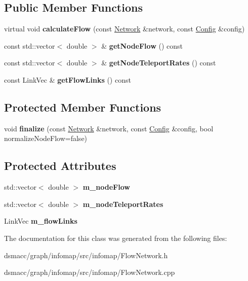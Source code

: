\subsection*{Public Member Functions}
\begin{DoxyCompactItemize}
\item 
\mbox{\label{classFlowNetwork_a7fe9ac86ec22ae9fb5a5212d30e3c014}} 
virtual void {\bfseries calculate\+Flow} (const \mbox{\hyperlink{classNetwork}{Network}} \&network, const \mbox{\hyperlink{structConfig}{Config}} \&config)
\item 
\mbox{\label{classFlowNetwork_ac7f6025ddeb7110f317882691a2cf35d}} 
const std\+::vector$<$ double $>$ \& {\bfseries get\+Node\+Flow} () const
\item 
\mbox{\label{classFlowNetwork_a1999937192326cad0d4f7d4f5aaab509}} 
const std\+::vector$<$ double $>$ \& {\bfseries get\+Node\+Teleport\+Rates} () const
\item 
\mbox{\label{classFlowNetwork_a974c66cb336b7df454c95b0335afa04d}} 
const Link\+Vec \& {\bfseries get\+Flow\+Links} () const
\end{DoxyCompactItemize}
\subsection*{Protected Member Functions}
\begin{DoxyCompactItemize}
\item 
\mbox{\label{classFlowNetwork_a451f5b6539134737dee056ad024ddab7}} 
void {\bfseries finalize} (const \mbox{\hyperlink{classNetwork}{Network}} \&network, const \mbox{\hyperlink{structConfig}{Config}} \&config, bool normalize\+Node\+Flow=false)
\end{DoxyCompactItemize}
\subsection*{Protected Attributes}
\begin{DoxyCompactItemize}
\item 
\mbox{\label{classFlowNetwork_ad149c0e9ea398fdf26afa8823b1b349e}} 
std\+::vector$<$ double $>$ {\bfseries m\+\_\+node\+Flow}
\item 
\mbox{\label{classFlowNetwork_a8af6bfb578aa5c30dd67152485a7396b}} 
std\+::vector$<$ double $>$ {\bfseries m\+\_\+node\+Teleport\+Rates}
\item 
\mbox{\label{classFlowNetwork_a52c0a9acf760b9350205a9686de51418}} 
Link\+Vec {\bfseries m\+\_\+flow\+Links}
\end{DoxyCompactItemize}


The documentation for this class was generated from the following files\+:\begin{DoxyCompactItemize}
\item 
dsmacc/graph/infomap/src/infomap/Flow\+Network.\+h\item 
dsmacc/graph/infomap/src/infomap/Flow\+Network.\+cpp\end{DoxyCompactItemize}
